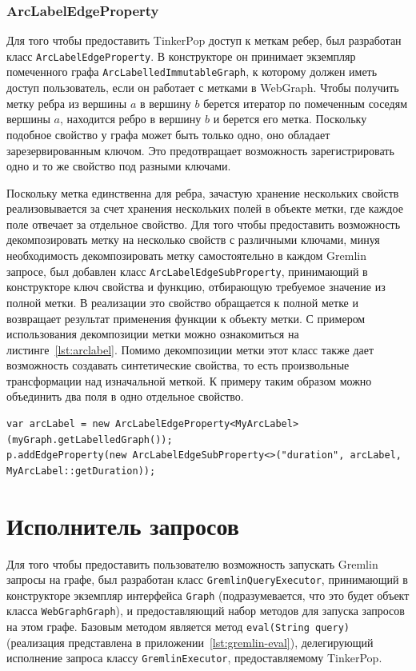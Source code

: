 \documentclass[times,specification,annotation]{itmo-student-thesis}
\begin{document}
\subsubsection{ArcLabelEdgeProperty}

Для того чтобы предоставить TinkerPop доступ к меткам ребер, был разработан класс \texttt{ArcLabelEdgeProperty}. В конструкторе он принимает экземпляр помеченного графа \texttt{ArcLabelledImmutableGraph}, к которому должен иметь доступ пользователь, если он работает с метками в WebGraph. Чтобы получить метку ребра из вершины $a$ в вершину $b$ берется итератор по помеченным соседям вершины $a$, находится ребро в вершину $b$ и берется его метка. Поскольку подобное свойство у графа может быть только одно, оно обладает зарезервированным ключом. Это предотвращает возможность зарегистрировать одно и то же свойство под разными ключами.

Поскольку метка единственна для ребра, зачастую хранение нескольких свойств реализовывается за счет хранения нескольких полей в объекте метки, где каждое поле отвечает за отдельное свойство. Для того чтобы предоставить возможность декомпозировать метку на несколько свойств с различными ключами, минуя необходимость декомпозировать метку самостоятельно в каждом Gremlin запросе, был добавлен класс \texttt{ArcLabelEdgeSubProperty}, принимающий в конструкторе ключ свойства и функцию, отбирающую требуемое значение из полной метки. В реализации это свойство обращается к полной метке и возвращает результат применения функции к объекту метки. С примером использования декомпозиции метки можно ознакомиться на листинге~\ref{lst:arclabel}. Помимо декомпозиции метки этот класс также дает возможность создавать синтетические свойства, то есть произвольные трансформации над изначальной меткой. К примеру таким образом можно объединить два поля в одно отдельное свойство.


\begin{lstlisting}[float=!h,caption={Пример декомпозиции метки},label={lst:arclabel}]
var arcLabel = new ArcLabelEdgeProperty<MyArcLabel>(myGraph.getLabelledGraph());
p.addEdgeProperty(new ArcLabelEdgeSubProperty<>("duration", arcLabel, MyArcLabel::getDuration));
\end{lstlisting}

\section{Исполнитель запросов}\label{sec:executor}

Для того чтобы предоставить пользователю возможность запускать Gremlin запросы на графе, был разработан класс \texttt{GremlinQueryExecutor}, принимающий в конструкторе экземпляр интерфейса \texttt{Graph} (подразумевается, что это будет объект класса \texttt{WebGraphGraph}), и предоставляющий набор методов для запуска запросов на этом графе. Базовым методом является метод \texttt{eval(String query)} (реализация представлена в приложении~\ref{lst:gremlin-eval}), делегирующий исполнение запроса классу \texttt{GremlinExecutor}, предоставляемому TinkerPop.
\end{document}

